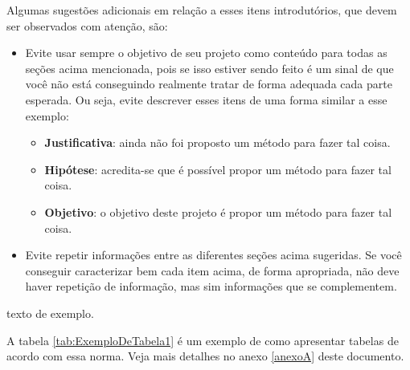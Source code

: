 \documentclass[
	12pt,				%
	oneside,			%
	a4paper,			%
	english,			%
	brazil				%
	]{abntex2ppgsi}
\begin{document}
Algumas sugestões adicionais em relação a esses itens introdutórios, que devem ser observados com atenção, são:
\begin{itemize}
	\item Evite usar sempre o objetivo de seu projeto como conteúdo para todas as seções acima mencionada, pois se isso estiver sendo feito é um sinal de que você não está conseguindo realmente tratar de forma adequada cada parte esperada. Ou seja, evite descrever esses itens de uma forma similar a esse exemplo:
	\begin{itemize}
		\item \textbf{Justificativa}: ainda não foi proposto um método para fazer tal coisa.
		\item \textbf{Hipótese}: acredita-se que é possível propor um método para fazer tal coisa.
		\item \textbf{Objetivo}: o objetivo deste projeto é propor um método para fazer tal coisa.
	\end{itemize}
	\item Evite repetir informações entre as diferentes seções acima sugeridas. Se você conseguir caracterizar bem cada item acima, de forma apropriada, não deve haver repetição de informação, mas sim informações que se complementem.
\end{itemize}





 texto de exemplo.  

A tabela \ref{tab:ExemploDeTabela1} é um exemplo de como apresentar tabelas de acordo com essa norma. Veja mais detalhes no anexo \ref{anexoA} deste documento.
\end{document}
